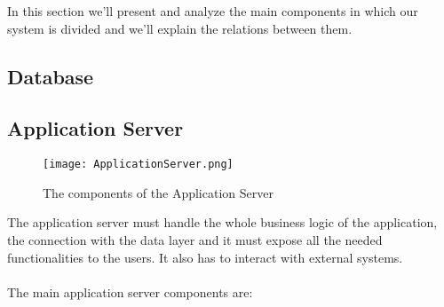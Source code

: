 In this section we'll present and analyze the main components in which our system is divided and we'll explain the relations between them.
\subsection{Database}
\label{subsect:Database}
			
\subsection{Application Server}
\label{subsect:Application Server}
			\begin{figure}[H]
				\begin{center}
					\hspace*{-60pt}
					\texttt{[image: ApplicationServer.png]}
				\end{center}
				\caption{The components of the Application Server}
			\end{figure}
The application server must handle the whole business logic of the application, the connection with the data layer and it must expose all the needed functionalities to the users. It also has to interact with external systems. \\ \\
The main application server components are:
